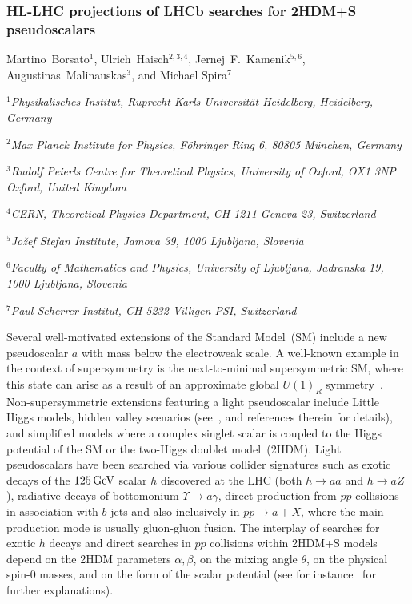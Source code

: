 \subsubsection{HL-LHC projections of LHCb searches for 2HDM+S pseudoscalars}
\begin{center}
 Martino~Borsato$^{1}$, Ulrich~Haisch$^{2,3,4}$, Jernej~F.~Kamenik$^{5,6}$, \\ Augustinas~Malinauskas$^3$, and Michael Spira$^{7}$\\
 \vspace{3mm}
\centerline{{\it $^{1}$Physikalisches Institut, Ruprecht-Karls-Universit\"{a}t Heidelberg, Heidelberg, Germany}}
\centerline{{\it  $^{2}$Max Planck Institute for Physics, F{\"o}hringer Ring 6, 80805 M{\"u}nchen, Germany}}
\centerline{{\it  $^{3}$Rudolf Peierls Centre for Theoretical Physics, University of Oxford, OX1 3NP Oxford, United Kingdom}}
\centerline{{\it  $^{4}$CERN, Theoretical Physics Department, CH-1211 Geneva 23, Switzerland}}
\centerline{{\it  $^{5}$Jo\v{z}ef Stefan Institute, Jamova 39, 1000 Ljubljana, Slovenia}}
\centerline{{\it  $^{6}$Faculty of Mathematics and Physics, University of Ljubljana, Jadranska 19, 1000 Ljubljana, Slovenia}}
\centerline{{\it  $^{7}$Paul Scherrer Institut, CH-5232 Villigen PSI, Switzerland}}
\end{center}

Several well-motivated extensions of the Standard Model~(SM) include a new pseudoscalar $a$ with mass below the electroweak scale. A well-known example in the context of supersymmetry is the next-to-minimal supersymmetric SM, where this state can arise as a result of an approximate global $U(1)_R$ symmetry~\cite{Dobrescu:2000yn}. Non-supersymmetric extensions featuring a light pseudoscalar include Little Higgs models, hidden valley scenarios (see~\cite{Curtin:2013fra}, and references therein for details), and simplified models where a complex singlet scalar is coupled to the Higgs potential of the SM or the two-Higgs doublet model~(2HDM). Light pseudoscalars have been searched via various collider signatures such as exotic decays of the $125 \, {\rm GeV}$ scalar $h$ discovered at the LHC (both $h\to aa$ and $h\to aZ$), radiative decays of bottomonium $\Upsilon\to a\gamma$, direct production from $pp$ collisions in association with $b$-jets and also inclusively in $pp\to a+X$, where the main production mode is usually gluon-gluon fusion. The interplay of searches for exotic $h$ decays and direct searches in $pp$ collisions within 2HDM+S models depend on the 2HDM parameters $\alpha, \beta$, on the mixing angle $\theta$, on the physical spin-0 masses, and on the form of the scalar potential (see for instance~\cite{Haisch:2018kqx} for further explanations).

